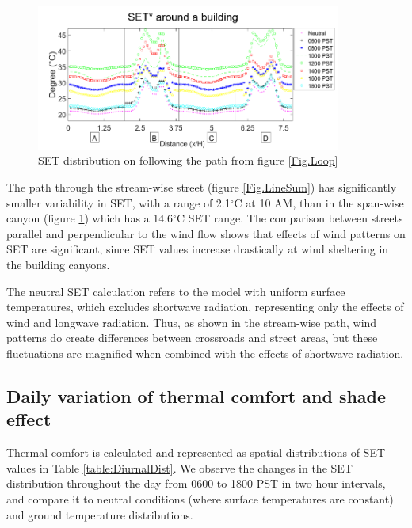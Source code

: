 \documentclass[preprint,3p,12pt,english]{elsarticle}
\begin{document}
\begin{figure}[H]
\graphicspath{ {image/} }
\centerline{\includegraphics[width=10cm]{loop_sum_final.png}}
\caption{SET distribution on following the path from figure  \ref{Fig.Loop}}
\label{Fig.LoopSum}
\end{figure}


The path through the stream-wise street (figure \ref{Fig.LineSum}) has significantly smaller variability in SET, with a range of 2.1$^{\circ}$C at 10 AM, than in the span-wise canyon (figure \ref{Fig.LoopSum}) which has a 14.6$^{\circ}$C SET range. The comparison between streets parallel and perpendicular to the wind flow shows that effects of wind patterns on SET are significant, since SET values increase drastically at wind sheltering in the building canyons. 

The neutral SET calculation refers to the model with uniform surface temperatures, which excludes shortwave radiation, representing only the effects of wind and longwave radiation. Thus, as shown in the stream-wise path, wind patterns do create differences between crossroads and street areas, but these fluctuations are magnified when combined with the effects of shortwave radiation. 




\subsection{Daily variation of thermal comfort and shade effect}

Thermal comfort is calculated and represented as spatial distributions of SET values in Table \ref{table:DiurnalDist}. We observe the changes in the SET distribution throughout the day from 0600 to 1800 PST in two hour intervals, and compare it to neutral conditions (where surface temperatures are constant) and ground temperature distributions. 
\end{document}
